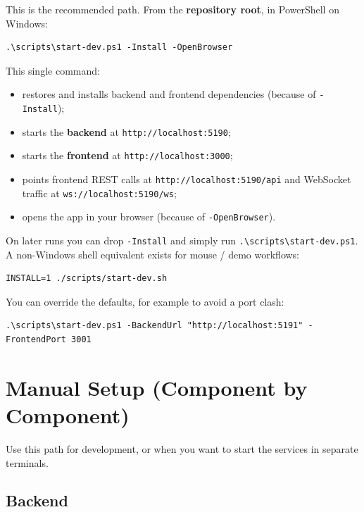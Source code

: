 This is the recommended path. From the \textbf{repository root}, in PowerShell on Windows:

\begin{Verbatim}[breaklines=true,breakanywhere=true,fontsize=\small]
.\scripts\start-dev.ps1 -Install -OpenBrowser
\end{Verbatim}

This single command:

\begin{itemize}
\tightlist
\item
  restores and installs backend and frontend dependencies (because of \texttt{-Install});
\item
  starts the \textbf{backend} at \texttt{http://localhost:5190};
\item
  starts the \textbf{frontend} at \texttt{http://localhost:3000};
\item
  points frontend REST calls at \texttt{http://localhost:5190/api} and WebSocket traffic at
  \texttt{ws://localhost:5190/ws};
\item
  opens the app in your browser (because of \texttt{-OpenBrowser}).
\end{itemize}

On later runs you can drop \texttt{-Install} and simply run \texttt{.\textbackslash{}scripts\textbackslash{}start-dev.ps1}. A non-Windows
shell equivalent exists for mouse / demo workflows:

\begin{Verbatim}[breaklines=true,breakanywhere=true,fontsize=\small]
INSTALL=1 ./scripts/start-dev.sh
\end{Verbatim}

You can override the defaults, for example to avoid a port clash:

\begin{Verbatim}[breaklines=true,breakanywhere=true,fontsize=\small]
.\scripts\start-dev.ps1 -BackendUrl "http://localhost:5191" -FrontendPort 3001
\end{Verbatim}

\FloatBarrier
\section{Manual Setup (Component by Component)}\label{5-manual-setup-component-by-component}

Use this path for development, or when you want to start the services in separate terminals.

\subsection{Backend}\label{51-backend}

